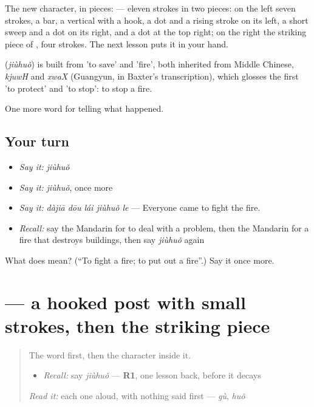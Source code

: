 The new character, in pieces:  — eleven strokes in two pieces: on the left seven strokes, a bar, a vertical with a hook, a dot and a rising stroke on its left, a short sweep and a dot on its right, and a dot at the top right; on the right the striking piece of , four strokes. The next lesson puts it in your hand.

\begin{cousinweb}
\textbf{} (\emph{jiùhuǒ}) is built from  'to save' and  'fire', both inherited from Middle Chinese, \emph{kjuwH} and \emph{xwaX} (Guangyun, in Baxter's transcription), which glosses the first 'to protect' and 'to stop': to stop a fire.
\end{cousinweb}

\begin{grammarlens}[title={What you've built}]
One more word for telling what happened.
\end{grammarlens}

\subsection*{Your turn}
\begin{itemize}
\raggedright
  \item \emph{Say it:} \emph{jiùhuǒ}
  \item \emph{Say it:} \emph{jiùhuǒ}, once more
  \item \emph{Say it:} \emph{dàjiā dōu lái jiùhuǒ le} — Everyone came to fight the fire.
  \item \emph{Recall:} say the Mandarin for to deal with a problem, then the Mandarin for a fire that destroys buildings, then say \emph{jiùhuǒ} again
\end{itemize}

\begin{tcolorbox}[breakable,colback=teal!4,colframe=teal!35!black,title={Before you move on}]
What does  mean? (\textquotedblleft{}To fight a fire; to put out a fire\textquotedblright{}.) Say it once more.
\end{tcolorbox}
\section[\texorpdfstring{\zh{救} (jiù)}{救 (jiù)}]{ — a hooked post with small strokes, then the striking piece}

\label{lesson:ZH-W298-jiu-save}



\begin{quote}
The word first, then the character inside it.

\begin{itemize}
\raggedright
  \item \emph{Recall:} say \emph{jiùhuǒ} — \textbf{R1}, one lesson back, before it decays
\end{itemize}

\begin{quote}
 
\end{quote}

\emph{Read it:} each one aloud, with nothing said first — \emph{gù}, \emph{huǒ}
\end{quote}

